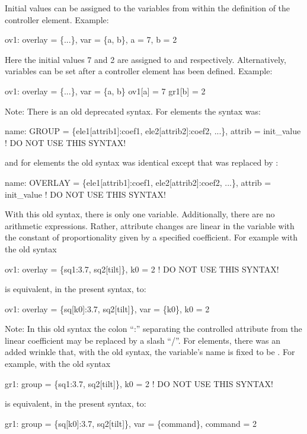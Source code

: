 Initial values can be assigned to the variables from within the
definition of the controller element. Example:
\begin{example}
  ov1: overlay = \{...\}, var = \{a, b\}, a = 7, b = 2
\end{example}
Here the initial values 7 and 2 are assigned to  and  respectively.  Alternatively,
variables can be set after a controller element has been defined.  Example:
\begin{example}
  ov1: overlay = \{...\}, var = \{a, b\}
  ov1[a] = 7
  gr1[b] = 2
\end{example}

Note: There is an old deprecated syntax. For  elements the syntax was:
\begin{example}
  name: GROUP = \{ele1[attrib1]:coef1, ele2[attrib2]:coef2, ...\}, 
                       attrib = init_value  ! DO NOT USE THIS SYNTAX!
\end{example}
and for  elements the old syntax was identical except
that  was replaced by :
\begin{example}
  name: OVERLAY = \{ele1[attrib1]:coef1, ele2[attrib2]:coef2, ...\}, 
                       attrib = init_value  ! DO NOT USE THIS SYNTAX!
\end{example}

With this old syntax, there is only one variable. Additionally, there are no arithmetic
expressions. Rather, attribute changes are linear in the  variable with the constant of
proportionality given by a specified coefficient. For example with the old syntax
\begin{example}
  ov1: overlay = \{sq1:3.7, sq2[tilt]\}, k0 = 2  ! DO NOT USE THIS SYNTAX!
\end{example}
is equivalent, in the present syntax, to:
\begin{example}
  ov1: overlay = \{sq[k0]:3.7, sq2[tilt]\}, var = \{k0\}, k0 = 2  
\end{example}
Note: In this old syntax the colon ``:'' separating the controlled attribute from the linear
coefficient may be replaced by a slash ``/''.  For  elements, there was an added wrinkle
that, with the old syntax, the variable's name is fixed to be . For example, with the
old syntax
\begin{example}
  gr1: group = \{sq1:3.7, sq2[tilt]\}, k0 = 2  ! DO NOT USE THIS SYNTAX!
\end{example}
is equivalent, in the present syntax, to:
\begin{example}
  gr1: group = \{sq[k0]:3.7, sq2[tilt]\}, var = \{command\}, command = 2  
\end{example}

